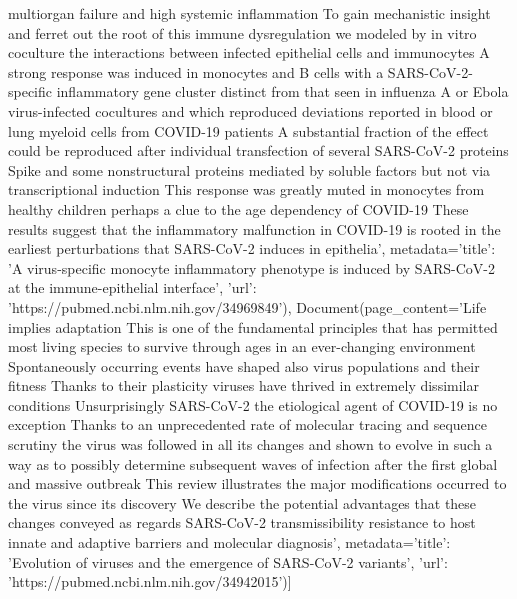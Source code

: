 multiorgan failure and high systemic inflammation To gain mechanistic insight and ferret out the root of this immune dysregulation we modeled by in vitro coculture the interactions between infected epithelial cells and immunocytes A strong response was induced in monocytes and B cells with a SARS-CoV-2-specific inflammatory gene cluster distinct from that seen in influenza A or Ebola virus-infected cocultures and which reproduced deviations reported in blood or lung myeloid cells from COVID-19 patients A substantial fraction of the effect could be reproduced after individual transfection of several SARS-CoV-2 proteins Spike and some nonstructural proteins mediated by soluble factors but not via transcriptional induction This response was greatly muted in monocytes from healthy children perhaps a clue to the age dependency of COVID-19 These results suggest that the inflammatory malfunction in COVID-19 is rooted in the earliest perturbations that SARS-CoV-2 induces in epithelia', metadata={'title': 'A virus-specific monocyte inflammatory phenotype is induced by SARS-CoV-2 at the immune-epithelial interface', 'url': 'https://pubmed.ncbi.nlm.nih.gov/34969849'}), Document(page\_content='Life implies adaptation This is one of the fundamental principles that has permitted most living species to survive through ages in an ever-changing environment Spontaneously occurring events have shaped also virus populations and their fitness Thanks to their plasticity viruses have thrived in extremely dissimilar conditions Unsurprisingly SARS-CoV-2 the etiological agent of COVID-19 is no exception Thanks to an unprecedented rate of molecular tracing and sequence scrutiny the virus was followed in all its changes and shown to evolve in such a way as to possibly determine subsequent waves of infection after the first global and massive outbreak This review illustrates the major modifications occurred to the virus since its discovery We describe the potential advantages that these changes conveyed as regards SARS-CoV-2 transmissibility resistance to host innate and adaptive barriers and molecular diagnosis', metadata={'title': 'Evolution of viruses and the emergence of SARS-CoV-2 variants', 'url': 'https://pubmed.ncbi.nlm.nih.gov/34942015'})]

